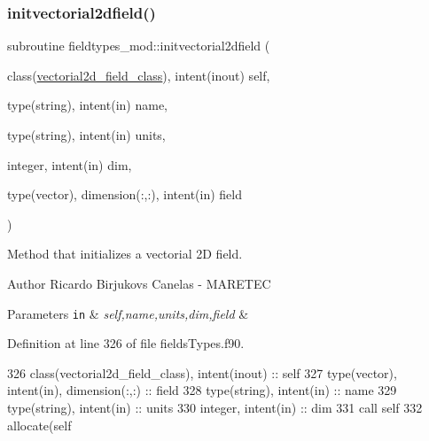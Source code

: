 \subsubsection{\texorpdfstring{initvectorial2dfield()}{initvectorial2dfield()}}
{\footnotesize\ttfamily subroutine fieldtypes\+\_\+mod\+::initvectorial2dfield (\begin{DoxyParamCaption}\item[{class(\mbox{\hyperlink{structfieldtypes__mod_1_1vectorial2d__field__class}{vectorial2d\+\_\+field\+\_\+class}}), intent(inout)}]{self,  }\item[{type(string), intent(in)}]{name,  }\item[{type(string), intent(in)}]{units,  }\item[{integer, intent(in)}]{dim,  }\item[{type(vector), dimension(\+:,\+:), intent(in)}]{field }\end{DoxyParamCaption})\hspace{0.3cm}{\ttfamily [private]}}



Method that initializes a vectorial 2D field. 

\begin{DoxyAuthor}{Author}
Ricardo Birjukovs Canelas -\/ M\+A\+R\+E\+T\+EC 
\end{DoxyAuthor}

\begin{DoxyParams}[1]{Parameters}
\mbox{\tt in}  & {\em self,name,units,dim,field} & \\
\hline
\end{DoxyParams}


Definition at line 326 of file fields\+Types.\+f90.


\begin{DoxyCode}
326     \textcolor{keywordtype}{class}(vectorial2d\_field\_class), \textcolor{keywordtype}{intent(inout)} :: self
327     \textcolor{keywordtype}{type}(vector), \textcolor{keywordtype}{intent(in)}, \textcolor{keywordtype}{dimension(:,:)} :: field
328     \textcolor{keywordtype}{type}(string), \textcolor{keywordtype}{intent(in)} :: name
329     \textcolor{keywordtype}{type}(string), \textcolor{keywordtype}{intent(in)} :: units
330     \textcolor{keywordtype}{integer}, \textcolor{keywordtype}{intent(in)} :: dim
331     \textcolor{keyword}{call }self%
332     \textcolor{keyword}{allocate}(self%
\end{DoxyCode}
\mbox{\label{namespacefieldtypes__mod_a20d935cfa1513350667d04f969be5e26}} 
